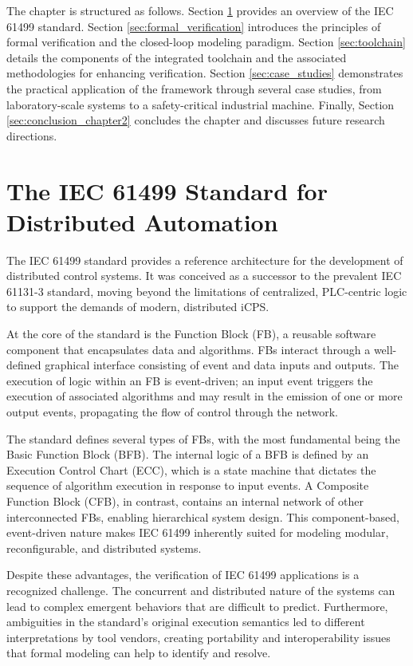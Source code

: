 The chapter is structured as follows. Section \ref{sec:iec61499} provides an overview of the IEC 61499 standard. Section \ref{sec:formal_verification} introduces the principles of formal verification and the closed-loop modeling paradigm. Section \ref{sec:toolchain} details the components of the integrated toolchain and the associated methodologies for enhancing verification. Section \ref{sec:case_studies} demonstrates the practical application of the framework through several case studies, from laboratory-scale systems to a safety-critical industrial machine. Finally, Section \ref{sec:conclusion_chapter2} concludes the chapter and discusses future research directions.

\section{The IEC 61499 Standard for Distributed Automation}\label{sec:iec61499}

The IEC 61499 standard provides a reference architecture for the development of distributed control systems. It was conceived as a successor to the prevalent IEC 61131-3 standard, moving beyond the limitations of centralized, PLC-centric logic to support the demands of modern, distributed iCPS.

At the core of the standard is the Function Block (FB), a reusable software component that encapsulates data and algorithms. FBs interact through a well-defined graphical interface consisting of event and data inputs and outputs. The execution of logic within an FB is event-driven; an input event triggers the execution of associated algorithms and may result in the emission of one or more output events, propagating the flow of control through the network.

The standard defines several types of FBs, with the most fundamental being the Basic Function Block (BFB). The internal logic of a BFB is defined by an Execution Control Chart (ECC), which is a state machine that dictates the sequence of algorithm execution in response to input events. A Composite Function Block (CFB), in contrast, contains an internal network of other interconnected FBs, enabling hierarchical system design. This component-based, event-driven nature makes IEC 61499 inherently suited for modeling modular, reconfigurable, and distributed systems.

Despite these advantages, the verification of IEC 61499 applications is a recognized challenge. The concurrent and distributed nature of the systems can lead to complex emergent behaviors that are difficult to predict. Furthermore, ambiguities in the standard's original execution semantics led to different interpretations by tool vendors, creating portability and interoperability issues that formal modeling can help to identify and resolve.

